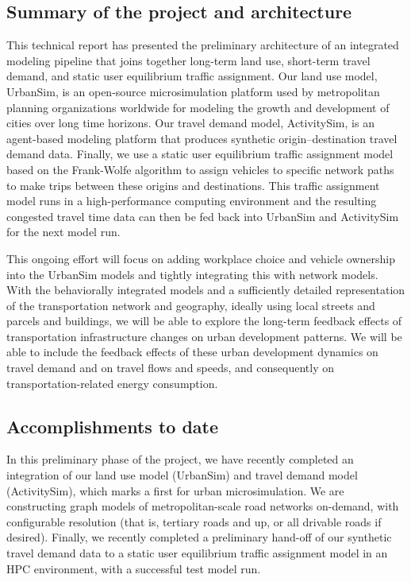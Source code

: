 \subsection{Summary of the project and architecture}

This technical report has presented the preliminary architecture of an integrated modeling pipeline that joins together long-term land use, short-term travel demand, and static user equilibrium traffic assignment. Our land use model, UrbanSim, is an open-source microsimulation platform used by metropolitan planning organizations worldwide for modeling the growth and development of cities over long time horizons. Our travel demand model, ActivitySim, is an agent-based modeling platform that produces synthetic origin--destination travel demand data. Finally, we use a static user equilibrium traffic assignment model based on the Frank-Wolfe algorithm to assign vehicles to specific network paths to make trips between these origins and destinations. This traffic assignment model runs in a high-performance computing environment and the resulting congested travel time data can then be fed back into UrbanSim and ActivitySim for the next model run. 

This ongoing effort will focus on adding workplace choice and vehicle ownership into the UrbanSim models and tightly integrating this with network models. With the behaviorally integrated models and a sufficiently detailed representation of the transportation network and geography, ideally using local streets and parcels and buildings, we will be able to explore the long-term feedback effects of transportation infrastructure changes on urban development patterns. We will be able to include the feedback effects of these urban development dynamics on travel demand and on travel flows and speeds, and consequently on transportation-related energy consumption.

\subsection{Accomplishments to date}

In this preliminary phase of the project, we have recently completed an integration of our land use model (UrbanSim) and travel demand model (ActivitySim), which marks a first for urban microsimulation. We are constructing graph models of metropolitan-scale road networks on-demand, with configurable resolution (that is, tertiary roads and up, or all drivable roads if desired). Finally, we recently completed a preliminary hand-off of our synthetic travel demand data to a static user equilibrium traffic assignment model in an HPC environment, with a successful test model run.

